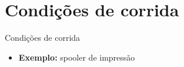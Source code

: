 \documentclass{beamer}
\begin{document}
\section{Condições de corrida}
\begin{frame}{Condições de corrida}
	\begin{itemize}
		\item \textbf{Exemplo:} spooler de impressão
	\end{itemize}
	\begin{figure}

\end{figure}
\end{frame}
\end{document}
